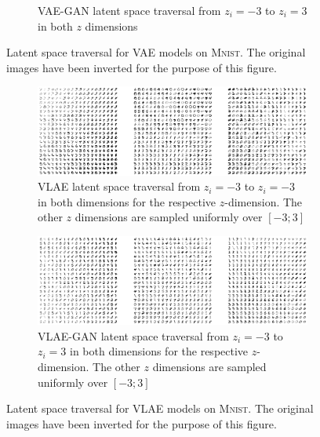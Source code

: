\begin{figure}
\begin{subfigure}{.45\textwidth}
        \caption{\ac{VAE}-\ac{GAN} latent space traversal from $z_i=-3$ to $z_i=3$ in both $z$ dimensions}
    \end{subfigure}
    \caption[\ac{VAE} Models on \textsc{Mnist} - Latent Space Traversal]{Latent space traversal for \ac{VAE} models on \textsc{Mnist}. The original images have been inverted for the purpose of this figure.}
    \label{fig:mnist_latent_space_traversal_vae}
\end{figure}
\begin{figure}
    \centering
    \begin{subfigure}{\textwidth}
        \centering
        \includegraphics[width=\textwidth]{images/latent_space_traversals/vlae_mnist.png}
        \caption{\ac{VLAE} latent space traversal from $z_i=-3$ to $z_i=-3$ in both dimensions for the respective $z$-dimension. The other $z$ dimensions are sampled uniformly over $[-3; 3]$}
        \label{subfig:vlae_mnist_latent_space_traversal}
    \end{subfigure}
    \begin{subfigure}{\textwidth}
        \centering
        \includegraphics[width=\textwidth]{images/latent_space_traversals/vlae_gan_mnist.png}
        \caption{\ac{VLAE}-\ac{GAN} latent space traversal from $z_i=-3$ to $z_i=3$ in both dimensions for the respective $z$-dimension. The other $z$ dimensions are sampled uniformly over $[-3; 3]$}
        \label{subfig:vlae_gan_mnist_latent_space_traversal}
    \end{subfigure}
    \caption[\ac{VLAE} Models on \textsc{Mnist} - Latent Space Traversal]{Latent space traversal for \ac{VLAE} models on \textsc{Mnist}. The original images have been inverted for the purpose of this figure.}
    \label{fig:mnist_latent_space_traversal_vlae}
\end{figure}

